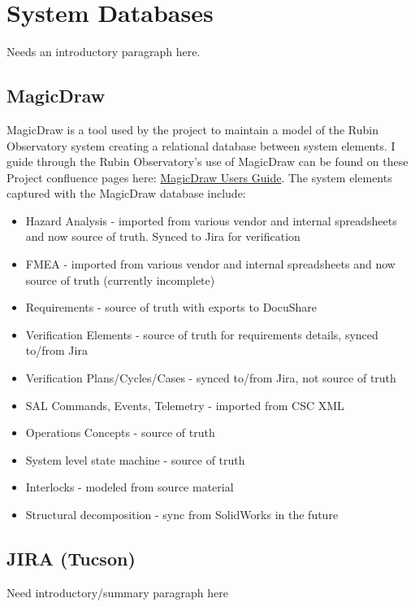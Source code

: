 \newpage
\section{System Databases}

Needs an introductory paragraph here.

\subsection{MagicDraw}

MagicDraw is a tool used by the project to maintain a model of the Rubin Observatory system creating a relational database between system elements.  I guide through the Rubin Observatory's use of MagicDraw can be found on these Project confluence pages here:  \href{https://confluence.lsstcorp.org/display/SYSENG/MagicDraw+LSST+Users+Guide}{MagicDraw Users Guide}.  The system elements captured with the MagicDraw database include:

\begin{itemize}
	\item Hazard Analysis - imported from various vendor and internal spreadsheets and now source of truth. Synced to Jira for verification
	\item FMEA - imported from various vendor and internal spreadsheets and now source of truth (currently incomplete)
	\item Requirements - source of truth with exports to DocuShare
	\item Verification Elements - source of truth for requirements details, synced to/from Jira
	\item Verification Plans/Cycles/Cases - synced to/from Jira, not source of truth
	\item SAL Commands, Events, Telemetry - imported from CSC XML
	\item Operations Concepts - source of truth
	\item System level state machine - source of truth
	\item Interlocks - modeled from source material
	\item Structural decomposition - sync from SolidWorks in the future
\end{itemize}

\subsection{JIRA (Tucson)}

Need introductory/summary paragraph here

